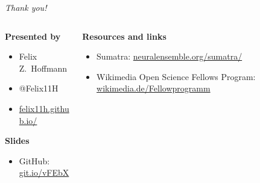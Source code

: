 \begin{frame}
  \begin{center} 
    \LARGE \textit{Thank you!}
  \end{center}
  
  \vspace{0.19cm}

  \small
  \begin{columns}[t]
    \begin{column}{0.4\textwidth}        
      \textbf{Presented by}
      
      \begin{itemize}[leftmargin=0.6cm]
        \itemsep0pt
      \item[] Felix Z.~Hoffmann
        \item[] @Felix11H
        \item[] \href{http://felix11h.github.io/}{felix11h.github.io/}
      \end{itemize}

      \vspace{0.38cm}
      \textbf{Slides}
      
      \begin{itemize}[leftmargin=0.6cm]
        \item[] GitHub:\\ %
          \href{https://github.com/Felix11H/GSoC14_munich_slides}{git.io/vFEbX}
      \end{itemize}
    \end{column}
    \begin{column}{0.59\textwidth}
      \textbf{Resources and links}
      \vspace{-0.1cm}
       
      \begin{itemize}[leftmargin=0.6cm]
        \itemsep4pt
        \item[] Sumatra: %
          \href{http://neuralensemble.org/sumatra/}{%
            neuralensemble.org/sumatra/}\\
        \item[] Wikimedia Open Science Fellows Program: %
          \href{https://wikimedia.de/wiki/BildungWissenschaftKultur/Fellowprogramm}{%
            wikimedia.de/Fellowprogramm}
      \end{itemize}


\end{column}
\end{columns}
\end{frame}
